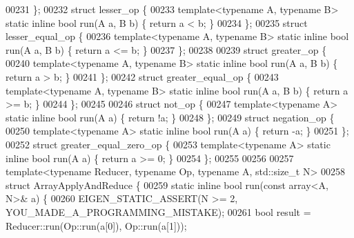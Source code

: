 \begin{DoxyCode}
00231 \};
00232 \textcolor{keyword}{struct }lesser\_op \{
00233   \textcolor{keyword}{template}<\textcolor{keyword}{typename} A, \textcolor{keyword}{typename} B> \textcolor{keyword}{static} \textcolor{keyword}{inline} \textcolor{keywordtype}{bool} run(A a, B b) \{ \textcolor{keywordflow}{return} a < b; \}
00234 \};
00235 \textcolor{keyword}{struct }lesser\_equal\_op \{
00236   \textcolor{keyword}{template}<\textcolor{keyword}{typename} A, \textcolor{keyword}{typename} B> \textcolor{keyword}{static} \textcolor{keyword}{inline} \textcolor{keywordtype}{bool} run(A a, B b) \{ \textcolor{keywordflow}{return} a <= b; \}
00237 \};
00238 
00239 \textcolor{keyword}{struct }greater\_op \{
00240   \textcolor{keyword}{template}<\textcolor{keyword}{typename} A, \textcolor{keyword}{typename} B> \textcolor{keyword}{static} \textcolor{keyword}{inline} \textcolor{keywordtype}{bool} run(A a, B b) \{ \textcolor{keywordflow}{return} a > b; \}
00241 \};
00242 \textcolor{keyword}{struct }greater\_equal\_op \{
00243   \textcolor{keyword}{template}<\textcolor{keyword}{typename} A, \textcolor{keyword}{typename} B> \textcolor{keyword}{static} \textcolor{keyword}{inline} \textcolor{keywordtype}{bool} run(A a, B b) \{ \textcolor{keywordflow}{return} a >= b; \}
00244 \};
00245 
00246 \textcolor{keyword}{struct }not\_op \{
00247   \textcolor{keyword}{template}<\textcolor{keyword}{typename} A> \textcolor{keyword}{static} \textcolor{keyword}{inline} \textcolor{keywordtype}{bool} run(A a) \{ \textcolor{keywordflow}{return} !a; \}
00248 \};
00249 \textcolor{keyword}{struct }negation\_op \{
00250   \textcolor{keyword}{template}<\textcolor{keyword}{typename} A> \textcolor{keyword}{static} \textcolor{keyword}{inline} \textcolor{keywordtype}{bool} run(A a) \{ \textcolor{keywordflow}{return} -a; \}
00251 \};
00252 \textcolor{keyword}{struct }greater\_equal\_zero\_op \{
00253   \textcolor{keyword}{template}<\textcolor{keyword}{typename} A> \textcolor{keyword}{static} \textcolor{keyword}{inline} \textcolor{keywordtype}{bool} run(A a) \{ \textcolor{keywordflow}{return} a >= 0; \}
00254 \};
00255 
00256 
00257 \textcolor{keyword}{template}<\textcolor{keyword}{typename} Reducer, \textcolor{keyword}{typename} Op, \textcolor{keyword}{typename} A, std::\textcolor{keywordtype}{size\_t} N>
00258 \textcolor{keyword}{struct }ArrayApplyAndReduce \{
00259   \textcolor{keyword}{static} \textcolor{keyword}{inline} \textcolor{keywordtype}{bool} run(\textcolor{keyword}{const} array<A, N>& a) \{
00260     EIGEN\_STATIC\_ASSERT(N >= 2, YOU\_MADE\_A\_PROGRAMMING\_MISTAKE);
00261     \textcolor{keywordtype}{bool} result = Reducer::run(Op::run(a[0]), Op::run(a[1]));

\end{DoxyCode}
